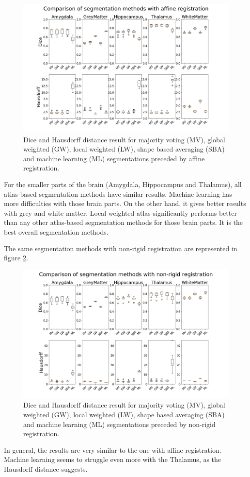\begin{figure}[h!]
	\centering
	\includegraphics[width = .48 \textwidth]{img/boxplot_Affine_all}
	\caption{Dice and Hausdorff distance result for majority voting (MV), global weighted (GW), local weighted (LW), shape based averaging (SBA) and machine learning (ML) segmentations preceded by affine registration.}
	\label{fig:boxplotAff}
\end{figure}

For the smaller parts of the brain (Amygdala, Hippocampus and Thalamus), all atlas-based segmentation methods have similar results. Machine learning has more difficulties with those brain parts. On the other hand, it gives better results with grey and white matter. Local weighted atlas significantly performs better than any other atlas-based segmentation methods for those brain parts. It is the best overall segmentation methods.

The same segmentation methods with non-rigid registration are represented in figure \ref{fig:boxplotNR}.

\begin{figure}[h!]
	\centering
	\includegraphics[width = .48 \textwidth]{img/boxplot_NR_all}
	\caption{Dice and Hausdorff distance result for majority voting (MV), global weighted (GW), local weighted (LW), shape based averaging (SBA) and machine learning (ML) segmentations preceded by non-rigid registration.}
	\label{fig:boxplotNR}
\end{figure}

In general, the results are very similar to the one with affine registration. Machine learning seems to struggle even more with the Thalamus, as the Hausdorff distance suggests.
